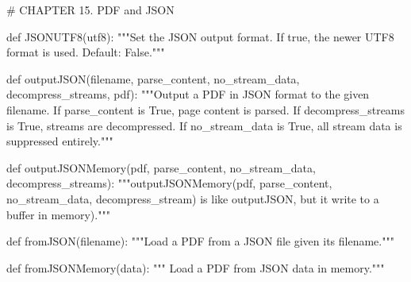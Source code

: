 # CHAPTER 15. PDF and JSON

def JSONUTF8(utf8):
    """Set the JSON output format. If true, the newer UTF8 format is used.
    Default: False."""

def outputJSON(filename, parse_content, no_stream_data, decompress_streams, pdf):
    """Output a PDF in JSON format to the given filename. If parse_content is
    True, page content is parsed. If decompress_streams is True, streams are
    decompressed. If no_stream_data is True, all stream data is suppressed
    entirely."""

def outputJSONMemory(pdf, parse_content, no_stream_data, decompress_streams):
    """outputJSONMemory(pdf, parse_content, no_stream_data, decompress_stream)
    is like outputJSON, but it write to a buffer in memory)."""

def fromJSON(filename):
    """Load a PDF from a JSON file given its filename."""

def fromJSONMemory(data):
    """ Load a PDF from JSON data in memory."""
